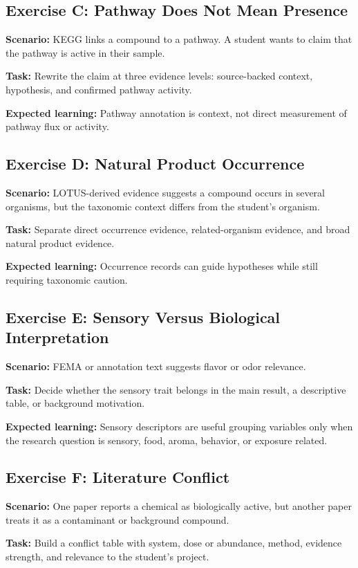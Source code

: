 \subsection{Exercise C: Pathway Does Not Mean Presence}
\textbf{Scenario:} KEGG links a compound to a pathway. A student wants to claim that the pathway is active in their sample.

\textbf{Task:} Rewrite the claim at three evidence levels: source-backed context, hypothesis, and confirmed pathway activity.

\textbf{Expected learning:} Pathway annotation is context, not direct measurement of pathway flux or activity.

\subsection{Exercise D: Natural Product Occurrence}
\textbf{Scenario:} LOTUS-derived evidence suggests a compound occurs in several organisms, but the taxonomic context differs from the student's organism.

\textbf{Task:} Separate direct occurrence evidence, related-organism evidence, and broad natural product evidence.

\textbf{Expected learning:} Occurrence records can guide hypotheses while still requiring taxonomic caution.

\subsection{Exercise E: Sensory Versus Biological Interpretation}
\textbf{Scenario:} FEMA or annotation text suggests flavor or odor relevance.

\textbf{Task:} Decide whether the sensory trait belongs in the main result, a descriptive table, or background motivation.

\textbf{Expected learning:} Sensory descriptors are useful grouping variables only when the research question is sensory, food, aroma, behavior, or exposure related.

\subsection{Exercise F: Literature Conflict}
\textbf{Scenario:} One paper reports a chemical as biologically active, but another paper treats it as a contaminant or background compound.

\textbf{Task:} Build a conflict table with system, dose or abundance, method, evidence strength, and relevance to the student's project.

